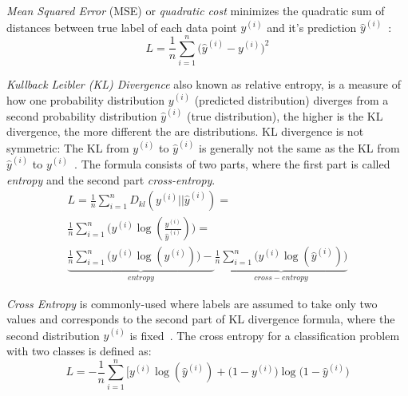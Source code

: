 \begin{inparaenum}
\item \emph{Mean Squared Error} (MSE) or \emph{quadratic cost} minimizes the quadratic sum of distances between true label of each data point $y^{ (i) }$ and it's prediction $\hat { y } ^{ (i) }$~: 
\begin{equation}
L=\frac { 1 }{ n } \sum _{ i=1 }^{ n }{ (\hat { y } ^{ (i) }- } y^{ (i) })^{ 2 }
\end{equation}
\item \emph{Kullback Leibler (KL) Divergence} also known as relative entropy, is a measure of how one probability distribution $y^{ (i) }$ (predicted distribution) diverges from a second probability distribution $\hat { y } ^{ (i) }$ (true distribution), the higher is the KL divergence, the more different the are distributions. KL divergence is not symmetric: The KL from $y^{ (i) }$ to $\hat { y } ^{ (i) }$ is generally not the same as the KL from $\hat { y } ^{ (i) }$ to $y^{ (i) }$~. The formula consists of two parts, where the first part is called \emph{entropy} and the second part \emph{cross-entropy}.
\begin{equation}
\begin{split}
L=\frac { 1 }{ n } \sum _{ i=1 }^{ n }{ D_{ kl }(y^{ (i) }||\hat { y } ^{ (i) }) } =\\
 \frac { 1 }{ n } \sum _{ i=1 }^{ n }{ (y^{ (i) }\log{(\frac { y^{ (i) } }{ \hat { y } ^{ (i) } } )) }} =\\
 \underbrace { \frac { 1 }{ n } \sum _{ i=1 }^{ n }{ (y^{ (i) }\log{(y^{ (i) })) }} - }_{ entropy } \underbrace { \frac { 1 }{ n } \sum _{ i=1 }^{ n }{ (y^{ (i) }\log{(\hat { y } ^{ (i) })) }}  }_{ cross-entropy } 
 \end{split}
\end{equation}
\item \emph{Cross Entropy} is commonly-used where labels are assumed to take only two values and corresponds to the second part of KL divergence formula, where the second distribution $\hat { y } ^{ (i) }$ is fixed~. The cross entropy for a classification problem with two classes is defined as:  
\begin{equation}
L=-\frac { 1 }{ n } \sum _{ i=1 }^{ n }{ [y^{ (i) }\log{(\hat { y } ^{ (i) })+(1-  y^{ (i) }}})\log{(1-\hat { y } ^{ (i) }})
\end{equation}
\end{inparaenum}
